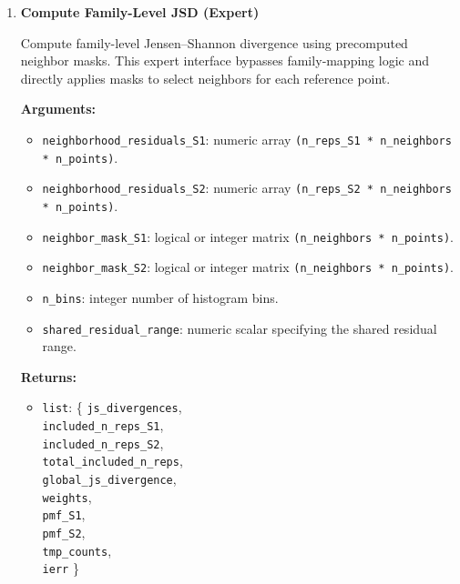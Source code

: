 \begin{enumerate}
        \begin{lstlisting}[language=R, caption={Family-Level JSD}]
out <- tox_fjct_compute_jsd(
  family_idx,
  gene_to_family_S1,
  gene_to_family_S2,
  neighborhood_residuals_S1,
  neighborhood_residuals_S2,
  neighborhood_genes_S1,
  neighborhood_genes_S2,
  n_bins,
  shared_residual_range
)

jsd        <- out$js_divergences
global_jsd <- out$global_js_divergence
weights    <- out$weights
        \end{lstlisting}

    \item \textbf{Compute Family-Level JSD (Expert)}

        Compute family-level Jensen–Shannon divergence using precomputed neighbor masks.  
        This expert interface bypasses family‑mapping logic and directly applies masks to select neighbors for each reference point.

        \textbf{Arguments:}
        \begin{itemize}
            \item \lstinline!neighborhood_residuals_S1!: numeric array \lstinline!(n_reps_S1 * n_neighbors * n_points)!.
            \item \lstinline!neighborhood_residuals_S2!: numeric array \lstinline!(n_reps_S2 * n_neighbors * n_points)!.
            \item \lstinline!neighbor_mask_S1!: logical or integer matrix \lstinline!(n_neighbors * n_points)!.
            \item \lstinline!neighbor_mask_S2!: logical or integer matrix \lstinline!(n_neighbors * n_points)!.
            \item \lstinline!n_bins!: integer number of histogram bins.
            \item \lstinline!shared_residual_range!: numeric scalar specifying the shared residual range.
        \end{itemize}

        \textbf{Returns:}
        \begin{itemize}
            \item \lstinline!list!: \{
                \lstinline!js_divergences!,\\
                \lstinline!included_n_reps_S1!,\\
                \lstinline!included_n_reps_S2!,\\
                \lstinline!total_included_n_reps!,\\
                \lstinline!global_js_divergence!,\\
                \lstinline!weights!,\\
                \lstinline!pmf_S1!,\\
                \lstinline!pmf_S2!,\\
                \lstinline!tmp_counts!,\\
                \lstinline!ierr!
            \}
        \end{itemize}


\end{enumerate}
